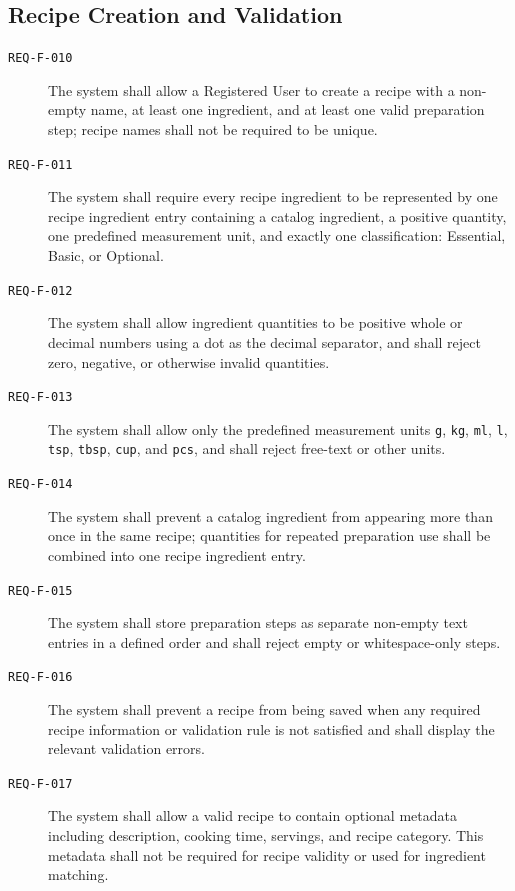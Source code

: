\documentclass[12pt]{article}
\begin{document}
\subsection{Recipe Creation and Validation}
\begin{description}
    \item[\texttt{REQ-F-010}] The system shall allow a Registered User to create a recipe with a non-empty name, at least one ingredient, and at least one valid preparation step; recipe names shall not be required to be unique.
    \item[\texttt{REQ-F-011}] The system shall require every recipe ingredient to be represented by one recipe ingredient entry containing a catalog ingredient, a positive quantity, one predefined measurement unit, and exactly one classification: Essential, Basic, or Optional.
    \item[\texttt{REQ-F-012}] The system shall allow ingredient quantities to be positive whole or decimal numbers using a dot as the decimal separator, and shall reject zero, negative, or otherwise invalid quantities.
    \item[\texttt{REQ-F-013}] The system shall allow only the predefined measurement units \texttt{g}, \texttt{kg}, \texttt{ml}, \texttt{l}, \texttt{tsp}, \texttt{tbsp}, \texttt{cup}, and \texttt{pcs}, and shall reject free-text or other units.
    \item[\texttt{REQ-F-014}] The system shall prevent a catalog ingredient from appearing more than once in the same recipe; quantities for repeated preparation use shall be combined into one recipe ingredient entry.
    \item[\texttt{REQ-F-015}] The system shall store preparation steps as separate non-empty text entries in a defined order and shall reject empty or whitespace-only steps.
    \item[\texttt{REQ-F-016}] The system shall prevent a recipe from being saved when any required recipe information or validation rule is not satisfied and shall display the relevant validation errors.
    \item[\texttt{REQ-F-017}] The system shall allow a valid recipe to contain optional metadata including description, cooking time, servings, and recipe category. This metadata shall not be required for recipe validity or used for ingredient matching.
\end{description}
\end{document}
